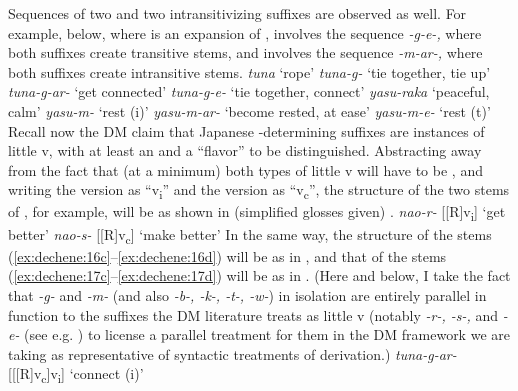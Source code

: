 \documentclass[output=paper,
modfonts
]{LSP/langsci}
\begin{document}
Sequences of two  and two intransitivizing
suffixes are observed as well. For example,  below, where  is
an expansion of , involves the sequence \textit{-g-e-,} where both
suffixes create transitive stems, and  involves the sequence
\textit{-m-ar-,} where both suffixes create intransitive stems.
\ea \label{ex:dechene:16}
	 \ea \label{ex:dechene:16a} \textit{tuna} `rope'
	 \ex \label{ex:dechene:16b} \textit{tuna-g-} `tie together, tie up'
	 \ex \label{ex:dechene:16c} \textit{tuna-g-ar-} `get connected'
	 \ex \label{ex:dechene:16d} \textit{tuna-g-e-} `tie together, connect'
	\z
\ex \label{ex:dechene:17} 
	 \ea \label{ex:dechene:17a} \textit{yasu-raka} `peaceful, calm'
	 \ex \label{ex:dechene:17b} \textit{yasu-m-} `rest (i)'
	 \ex \label{ex:dechene:17c} \textit{yasu-m-ar-} `become rested, at ease'
	 \ex \label{ex:dechene:17d} \textit{yasu-m-e-} `rest (t)'
	\z
\z
Recall now the DM claim that Japanese -determining suffixes
are instances of little v, with at least an  and a 
``flavor'' \citep[107]{marantz2013a} to be distinguished. Abstracting away from
the fact that (at a minimum) both types of little v will have to be
, and writing the  version as ``v\textsubscript{i}''
and the  version as ``v\textsubscript{c}'', the structure of
the two stems of , for example, will be as shown in  (simplified
glosses given) .
\ea \label{ex:dechene:18}
	\ea \label{ex:dechene:18a} \textit{nao-r-} {[}{[}R{]}v\textsubscript{i}{]} `get better'
	\ex \label{ex:dechene:18b} \textit{nao-s-} {[}{[}R{]}v\textsubscript{c}{]} `make better'
	\z
\z
In the same way, the structure of the stems (\ref{ex:dechene:16c}--\ref{ex:dechene:16d}) will be as in
, and that of the stems (\ref{ex:dechene:17c}--\ref{ex:dechene:17d}) will be as in . (Here and
below, I take the fact that \textit{-g-} and \textit{-m-} (and also
\textit{-b-, -k-, -t-, -w-}) in isolation are entirely parallel in
function to the suffixes the DM literature treats as little v (notably
\textit{-r-, -s-,} and \textit{-e-} (see e.g. \citealt[108]{marantz2013a}) to license
a parallel treatment for them in the DM framework we are taking as
representative of syntactic treatments of derivation.)
\ea \label{ex:dechene:19}
	\ea \label{ex:dechene:19a} \textit{tuna-g-ar-} {[}{[}{[}R{]}v\textsubscript{c}{]}v\textsubscript{i}{]} `connect (i)'
\end{document}
